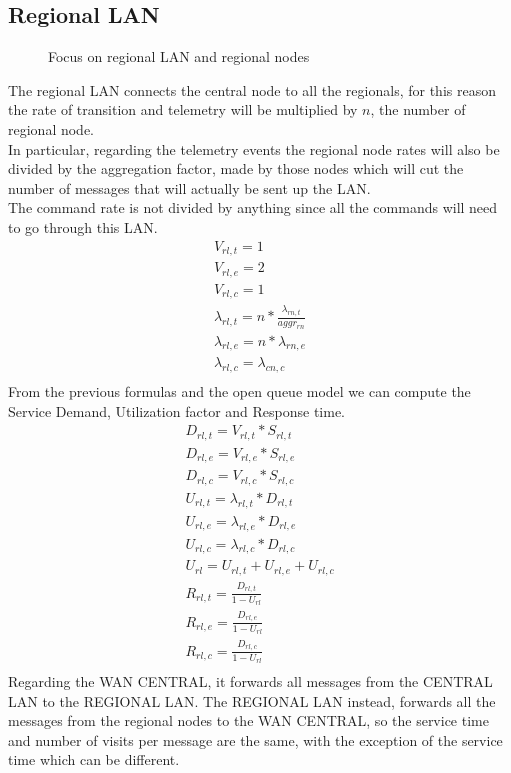 \documentclass[11pt]{article}
\begin{document}
\subsection{Regional LAN}
\begin{figure}[H]
	\hspace*{-3.75cm}
	\centering
	\frame{}
	\caption{Focus on regional LAN and regional nodes}
\end{figure}
The regional LAN connects the central node to all the regionals, for this reason the rate of transition and telemetry will be multiplied by $n$, the number of regional node.\\
In particular, regarding the telemetry events the regional node rates will also be divided by the aggregation factor, made by those nodes which will cut the number of messages that will actually be sent up the LAN.\\
The command rate is not divided by anything since all the commands will need to go through this LAN.
\begin{equation}
	\begin{array}{l}
		V_{rl, t} = 1 \\
		V_{rl, e} = 2 \\ %
		V_{rl,c} = 1 \\
		\lambda_{rl, t} = n*\frac{\lambda_{rn, t}}{aggr_{rn}} \\
		\lambda_{rl, e} = n*\lambda_{rn, e} \\
		\lambda_{rl, c} = \lambda_{cn, c} \\
	\end{array}
\end{equation}
From the previous formulas and the open queue model we can compute the Service Demand, Utilization factor and Response time.
\begin{equation}
	\begin{array}{l}
		D_{rl, t} = V_{rl, t} * S_{rl, t} \\
		D_{rl, e} = V_{rl, e} * S_{rl, e} \\
		D_{rl, c} = V_{rl, c} * S_{rl, c} \\
		U_{rl, t} = \lambda_{rl, t} * D_{rl, t} \\
		U_{rl, e} = \lambda_{rl, e} * D_{rl, e} \\
		U_{rl, c} = \lambda_{rl, c} * D_{rl, c} \\
		U_{rl} = U_{rl, t} + U_{rl, e} + U_{rl, c} \\
		R_{rl, t} = \frac{D_{rl, t}}{1 - U_{rl}} \\
		R_{rl, e} = \frac{D_{rl, e}}{1 - U_{rl}} \\
		R_{rl, c} = \frac{D_{rl, c}}{1 - U_{rl}} \\
	\end{array}
\end{equation}
Regarding the WAN CENTRAL, it forwards all messages from the CENTRAL LAN to the REGIONAL LAN. The REGIONAL LAN instead, forwards all the messages from the regional nodes to the WAN CENTRAL, so the service time and number of visits per message are the same, with the exception of the service time which can be different.
\end{document}
